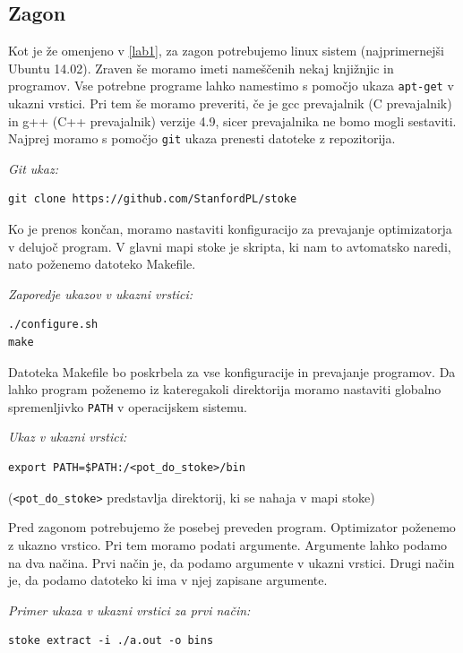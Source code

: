 \documentclass[a4paper, 12pt]{book}
\begin{document}
	\subsection{Zagon}
	\label{zg1}
	Kot je že omenjeno v \ref{lab1}, za zagon potrebujemo linux sistem (najprimernejši Ubuntu 14.02). Zraven še moramo imeti nameščenih nekaj knjižnjic in programov. Vse potrebne programe lahko namestimo s pomočjo ukaza \texttt{apt-get} v ukazni vrstici. Pri tem še moramo preveriti, če je gcc prevajalnik (C prevajalnik) in g++ (C++ prevajalnik) verzije 4.9, sicer prevajalnika ne bomo mogli sestaviti. Najprej moramo s pomočjo \texttt{git} ukaza prenesti datoteke z repozitorija.
	\medskip
		
	\noindent
	{\it Git ukaz:}
\begin{Verbatim}[baselinestretch=1]
git clone https://github.com/StanfordPL/stoke
\end{Verbatim}

	Ko je prenos končan, moramo nastaviti konfiguracijo za prevajanje optimizatorja v delujoč program. V glavni mapi stoke je skripta, ki nam to avtomatsko naredi, nato poženemo datoteko Makefile.
	\medskip
	
	\noindent
	{\it Zaporedje ukazov v ukazni vrstici:}
	\begin{Verbatim}[baselinestretch=1]
./configure.sh
make
	\end{Verbatim}
	
	Datoteka Makefile bo poskrbela za vse konfiguracije in prevajanje programov. Da lahko program poženemo iz kateregakoli direktorija moramo nastaviti globalno spremenljivko \texttt{PATH} v operacijskem sistemu.
	\medskip
	
	\noindent
	{\it Ukaz v ukazni vrstici:}
	\begin{Verbatim}[baselinestretch=1]
export PATH=$PATH:/<pot_do_stoke>/bin
	\end{Verbatim}
	
	\noindent
	{\small (\texttt{<pot\_do\_stoke>} predstavlja direktorij, ki se nahaja v mapi stoke)}
	
	Pred zagonom potrebujemo že posebej preveden program. Optimizator poženemo z ukazno vrstico. Pri tem moramo podati argumente. Argumente lahko podamo na dva načina. Prvi način je, da podamo argumente v ukazni vrstici. Drugi način je, da podamo datoteko ki ima v njej zapisane argumente. 
	\medskip
	
	\noindent
	{\it Primer ukaza v ukazni vrstici za prvi način:}
\begin{Verbatim}[baselinestretch=1]
stoke extract -i ./a.out -o bins
\end{Verbatim}
\medskip
\end{document}
